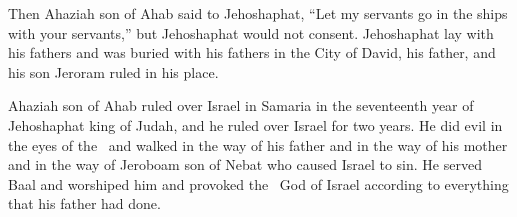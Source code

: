 \begin{inparaenum}
   Then Ahaziah son of Ahab said to Jehoshaphat, ``Let my servants go in the ships with your servants,'' but Jehoshaphat would not consent.%
   Jehoshaphat lay with his fathers and was buried with his fathers in the City of David, his father, and his son Jeroram ruled in his place.%
  
   Ahaziah son of Ahab ruled over Israel in Samaria in the seventeenth year of Jehoshaphat king of Judah, and he ruled over Israel for two years.%
   He did evil in the eyes of the \lord\ and walked in the way of his father and in the way of his mother and in the way of Jeroboam son of Nebat who caused Israel to sin.%
   He served Baal and worshiped him and provoked the \lord\ God of Israel according to everything that his father had done.%
\end{inparaenum}
